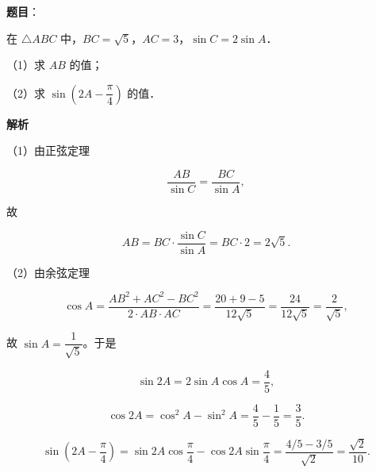 \begin{answer}

\textbf{题目}：

在 $\triangle ABC$ 中，$BC=\sqrt5$，$AC=3$，$\sin C=2\sin A$．

（1）求 $AB$ 的值；

（2）求 $\sin\left(2A-\dfrac{\pi}{4}\right)$ 的值．

\textbf{解析}

（1）由正弦定理

\nopagebreak[4]
\[\frac{AB}{\sin C}=\frac{BC}{\sin A},\]

故

\nopagebreak[4]
\[AB=BC\cdot\frac{\sin C}{\sin A}=BC\cdot2=2\sqrt5 .\]

（2）由余弦定理

\nopagebreak[4]
\[\cos A=\frac{AB^2+AC^2-BC^2}{2\cdot AB\cdot AC}
=\frac{20+9-5}{12\sqrt5}=\frac{24}{12\sqrt5}=\frac{2}{\sqrt5},\]

故 $\sin A=\dfrac1{\sqrt5}$。于是

\nopagebreak[4]
\[\sin2A=2\sin A\cos A=\frac45,\]

\nopagebreak[4]
\[\cos2A=\cos^2A-\sin^2A=\frac45-\frac15=\frac35 .\]

\nopagebreak[4]
\[\sin\left(2A-\frac\pi4\right)
=\sin2A\cos\frac\pi4-\cos2A\sin\frac\pi4
=\frac{4/5-3/5}{\sqrt2}=\frac{\sqrt2}{10} .\]


\end{answer}
